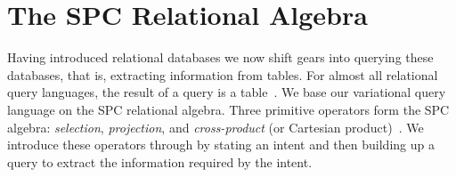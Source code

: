 \section{The SPC Relational Algebra}
\label{sec:ra}

Having introduced relational databases we now shift gears into querying
these databases, that is, extracting information from tables.
For almost all relational query languages, the result of a query 
is a table~\cite{AliceBook}. 
%
We base our variational query language on the SPC relational algebra.
Three primitive operators form the SPC algebra: \emph{selection}, \emph{projection},
and \emph{cross-product} (or Cartesian product)~\cite{AliceBook}.
We introduce these operators through  by stating an intent and then
building up a query to extract the information required by the intent. 

